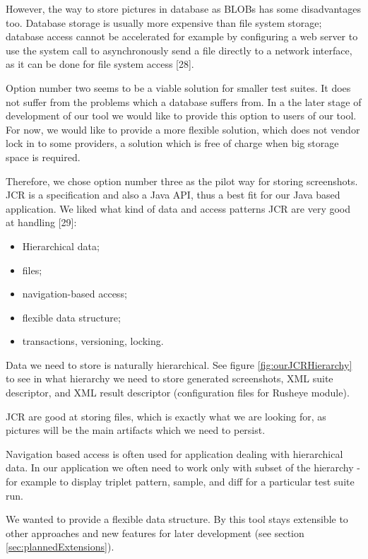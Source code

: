 \documentclass[11pt,oneside,final]{fithesis2}
\begin{document}
    However, the way to store pictures in database as BLOBs has some disadvantages too. Database storage is usually more expensive
    than file system storage; database access cannot be accelerated for example by configuring a web server to use the system call to
    asynchronously send a file directly to a network interface, as it can be done for file system access [28].
    
    Option number two seems to be a viable solution for smaller test suites. It does not suffer from the problems which a database suffers from.
    In a the later stage of development of our tool we would like to provide this option to users of our tool. For now, we would like to
    provide a more flexible solution, which does not vendor lock in to some providers, a solution which is free of charge when big storage
    space is required.
    
    Therefore, we chose option number three as the pilot way for storing screenshots. JCR is a specification and also a Java
    API, thus a best fit for our Java based application. We liked what kind of data and access
    patterns JCR are very good at handling [29]:
    
    \begin{itemize}
     \item Hierarchical data;
     \item files;
     \item navigation-based access;
     \item flexible data structure;
     \item transactions, versioning, locking.
    \end{itemize}
    
    Data we need to store is naturally hierarchical. See figure \ref{fig:ourJCRHierarchy} to 
    see in what hierarchy we need to store generated screenshots, XML suite descriptor, and XML result descriptor (configuration
    files for Rusheye module).
    
    JCR are good at storing files, which is exactly what we are looking for, as pictures will be the main artifacts which we need to
    persist.
    
    Navigation based access is often used for application dealing with hierarchical data. In our application we often need to work
    only with subset of the hierarchy - for example to display triplet pattern, sample, and diff for a particular test suite run.
    
    We wanted to provide a flexible data structure. By this tool stays extensible to other approaches and new features for later
    development (see section \ref{sec:plannedExtensions}).
    
\end{document}
